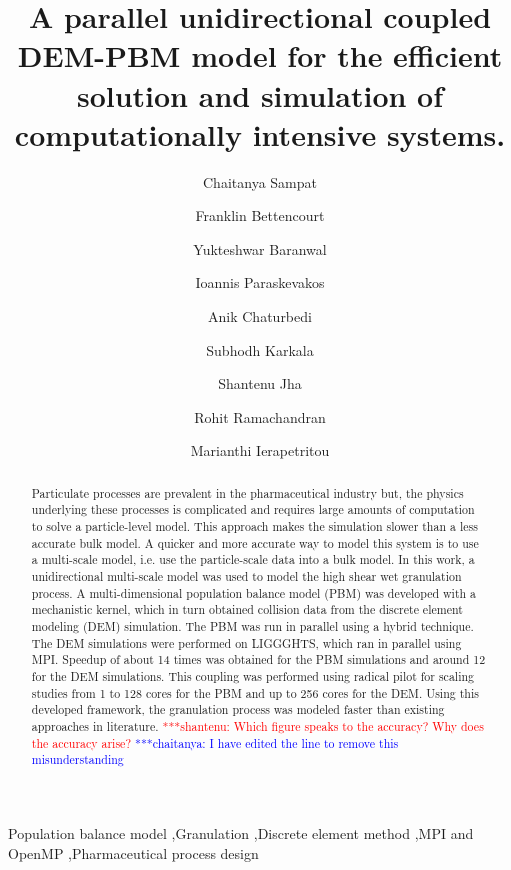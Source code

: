 \documentclass[preprint,11pt,authoryear]{elsarticle}
\newcommand{\jhanote}[1]{ {\textcolor{red} { ***shantenu: #1 }}}
\newcommand{\csnote}[1]{ {\textcolor{blue} { ***chaitanya: #1 }}}
\newcommand{\jhanote}[1]{}
\newcommand{\csnote}[1]{}
\begin{document}
\begin{frontmatter}

\title{A parallel unidirectional coupled DEM-PBM model for the efficient solution and simulation of 
computationally  intensive systems.}
\author[add1]{Chaitanya Sampat}
\author[add1]{Franklin Bettencourt}
\author[add1]{Yukteshwar Baranwal}
\author[add2]{Ioannis Paraskevakos}
\author[add1]{Anik Chaturbedi}
\author[add1]{Subhodh Karkala}
\author[add2]{Shantenu Jha}
\author[add1]{Rohit Ramachandran}
\author[add1]{Marianthi Ierapetritou}
\address[add1]{Department of Chemical and Biochemical Engineering, Rutgers, The State University of New
Jersey, Piscataway, NJ, USA-08854}
\address[add2]{Electrical and Computer Engineering, Rutgers, The State University of New Jersey, 
Piscataway, NJ, USA-08854}

\begin{abstract}
Particulate processes are prevalent in the pharmaceutical industry but, the 
physics underlying these processes is complicated and requires large amounts
of computation to solve a particle-level model. This approach makes the
simulation slower than a less accurate bulk model. A quicker
and more accurate way to model this system is to use a multi-scale model, 
i.e. use the particle-scale data into a bulk model. In this work, a
unidirectional multi-scale model was used to model the high shear wet
granulation process. A multi-dimensional population balance model (PBM) was
developed with a mechanistic kernel, which in turn obtained 
collision data from the discrete element modeling (DEM) simulation. The PBM
was run in parallel using a hybrid technique. The DEM simulations were
performed on LIGGGHTS, which ran in parallel using MPI. Speedup of about 14
times was obtained for the PBM simulations and around 12 for the DEM
simulations. This coupling was performed using radical pilot for scaling
studies from 1 to 128 cores for the PBM and up to 256 cores for the DEM. 
Using this developed framework, the granulation process was modeled 
faster than existing approaches in literature. 
\jhanote{Which figure speaks to the accuracy? Why does the accuracy arise?} \csnote{I have edited 
the line to remove this misunderstanding}
\end{abstract}
\begin{keyword}
Population balance model \sep Granulation \sep Discrete element method  \sep MPI and OpenMP 
\sep Pharmaceutical process design
\end{keyword}
\end{frontmatter}
\linenumbers
\end{document}
